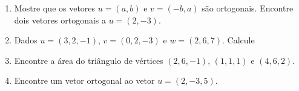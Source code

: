 \documentclass[a4paper,5pt]{amsbook}
\begin{document}
\begin{enumerate}

	\vspace{0.5cm}
	\item Mostre que os vetores $u=(a,b)$ e $v=(-b,a)$ s\~ao ortogonais. Encontre
		dois vetores ortogonais a $u=(2,-3)$. 

	\vspace{0.5cm}
	\item Dados $u=(3,2,-1)$, $v=(0,2,-3)$ e $w=(2,6,7)$. Calcule


	\vspace{0.5cm}
	\item Encontre a \'area do tri\^angulo de v\'ertices $(2,6,-1)$, $(1,1,1)$ e $(4,6,2)$.
	
	\vspace{0.5cm}
	\item Encontre um vetor ortogonal ao vetor $u=(2,-3,5)$.
\end{enumerate}
\end{document}
